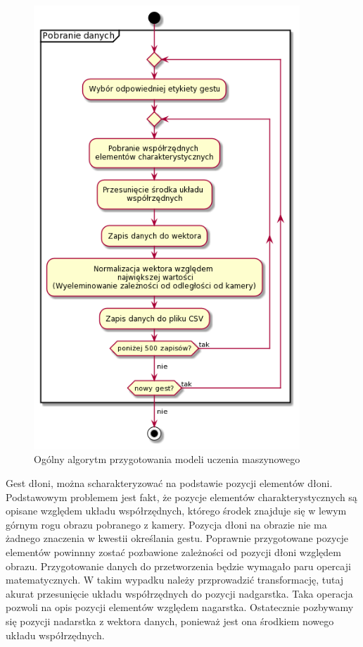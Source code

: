\begin{figure}[H]
    \begin{center}
        \includegraphics[width=10cm]{../images/get_data.png}
        \caption{Ogólny algorytm przygotowania modeli uczenia maszynowego}
    \end{center}
\end{figure}

\quad Gest dłoni, można scharakteryzować na podstawie pozycji elementów dłoni. Podstawowym problemem jest fakt, że pozycje elementów charakterystycznych są opisane względem układu współrzędnych, którego środek znajduje się w lewym górnym rogu obrazu pobranego z kamery. Pozycja dłoni na obrazie nie ma żadnego znaczenia w kwestii określania gestu. Poprawnie przygotowane pozycje elementów powinnny zostać pozbawione zależności od pozycji dłoni względem obrazu. 
\quad Przygotowanie danych do przetworzenia będzie wymagało paru opercaji matematycznych. W takim wypadku należy przprowadzić transformację, tutaj akurat przesunięcie układu współrzędnych do pozycji nadgarstka. Taka operacja pozwoli na opis pozycji elementów względem nagarstka. Ostatecznie pozbywamy się pozycji nadarstka z wektora danych, ponieważ jest ona środkiem nowego układu współrzędnych. 

